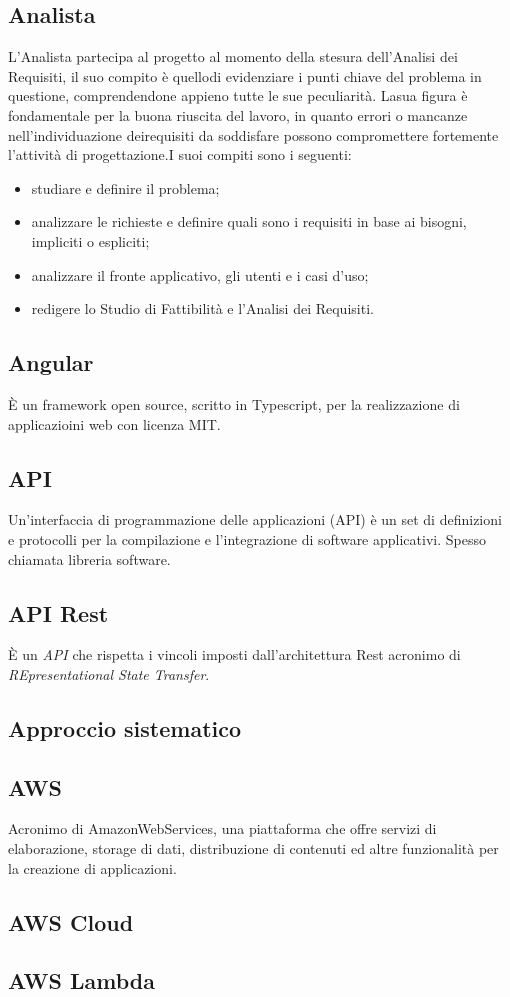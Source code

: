 \subsection*{Analista} L’Analista partecipa al progetto al momento della stesura dell’Analisi dei Requisiti, il suo compito è quellodi evidenziare i punti chiave del problema in questione, comprendendone appieno tutte le sue peculiarità. Lasua figura è fondamentale per la buona riuscita del lavoro, in quanto errori o mancanze nell’individuazione deirequisiti da soddisfare possono compromettere fortemente l’attività di progettazione.I suoi compiti sono i seguenti:
\begin{itemize}
    \item studiare e definire il problema;
    \item analizzare le richieste e definire quali sono i requisiti in base ai bisogni, impliciti o espliciti;
    \item analizzare il fronte applicativo, gli utenti e i casi d’uso;
    \item redigere lo Studio di Fattibilità e l’Analisi dei Requisiti.
\end{itemize}
\subsection*{Angular} È un framework open source, scritto in Typescript, per la realizzazione di applicazioini web con licenza MIT.
\subsection*{API} Un'interfaccia di programmazione delle applicazioni (API) è un set di definizioni e protocolli per la compilazione e l'integrazione di software applicativi. Spesso chiamata libreria software.
\subsection*{API Rest} È un \textit{API} che rispetta i vincoli imposti dall'architettura Rest acronimo di \textit{REpresentational State Transfer}.
\subsection*{Approccio sistematico}
\subsection*{AWS} Acronimo di AmazonWebServices, una piattaforma che offre servizi di elaborazione, storage di dati, distribuzione di contenuti ed altre funzionalità per la creazione di applicazioni.
\subsection*{AWS Cloud}
\subsection*{AWS Lambda}


\newpage

